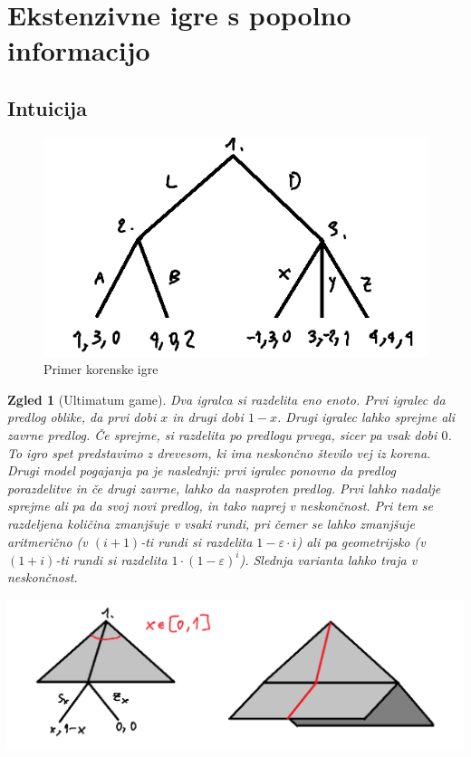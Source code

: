 \documentclass[10pt, a4paper]{article}
\newtheorem{zgled}[izr]{Zgled}
\begin{document}
\section{Ekstenzivne igre s popolno informacijo}

\subsection{Intuicija}

\begin{figure}[hbt!]
  \centering
  \includegraphics[scale=0.75]{drevo_1.png}
  \caption{Primer korenske igre}
\end{figure}

\begin{zgled}[Ultimatum game]
  Dva igralca si razdelita eno enoto. Prvi igralec da predlog oblike, da prvi dobi $x$ in drugi dobi $1 - x$.
  Drugi igralec lahko sprejme ali zavrne predlog. Če sprejme, si razdelita po predlogu prvega, sicer pa vsak dobi $0$.
  To igro spet predstavimo z drevesom, ki ima neskončno število vej iz korena. Drugi model
  pogajanja pa je naslednji: prvi igralec ponovno da predlog porazdelitve in če drugi zavrne, lahko da nasproten predlog.
  Prvi lahko nadalje sprejme ali pa da svoj novi predlog, in tako naprej v neskončnost.
  Pri tem se razdeljena količina zmanjšuje v vsaki rundi, pri čemer se lahko zmanjšuje aritmerično (v $(i+1)$-ti rundi si razdelita $1 - \varepsilon \cdot i$)
  ali pa geometrijsko (v $(1 + i)$-ti rundi si razdelita $1 \cdot (1 - \varepsilon)^i$). Slednja varianta lahko traja v neskončnost. 
  \begin{center}
    \includegraphics[scale=0.65]{drevo_2.png}
  \end{center}
\end{zgled}
\end{document}
